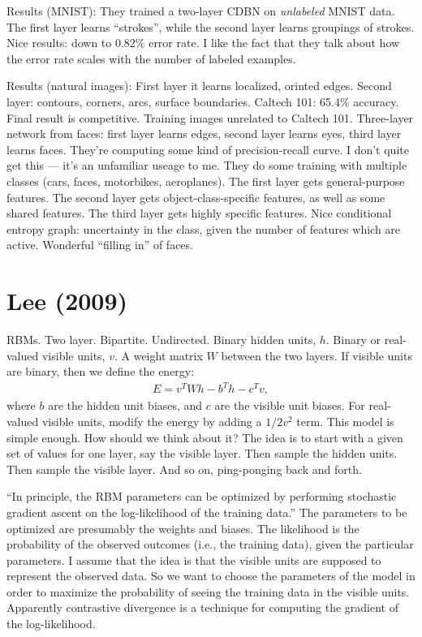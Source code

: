 \documentclass[12pt]{report}
\begin{document}
Results (MNIST): They trained a two-layer CDBN on \emph{unlabeled}
MNIST data.  The first layer learns ``strokes'', while the second
layer learns groupings of strokes.  Nice results: down to 0.82\% error
rate.  I like the fact that they talk about how the error rate scales
with the number of labeled examples.

Results (natural images): First layer it learns localized, orinted
edges.  Second layer: contours, corners, arcs, surface boundaries.
Caltech 101: 65.4\% accuracy.  Final result is competitive.  Training
images unrelated to Caltech 101.  Three-layer network from faces:
first layer learns edges, second layer learns eyes, third layer learns
faces.  They're computing some kind of precision-recall curve.  I
don't quite get this --- it's an unfamiliar useage to me.  They do
some training with multiple classes (cars, faces, motorbikes,
aeroplanes).  The first layer gets general-purpose features.  The
second layer gets object-class-specific features, as well as some
shared features.  The third layer gets highly specific features.  Nice
conditional entropy graph: uncertainty in the class, given the number
of features which are active.  Wonderful ``filling in'' of faces.

\section{Lee (2009)} 

RBMs.  Two layer.  Bipartite.  Undirected.  Binary hidden units, $h$.
Binary or real-valued visible units, $v$.  A weight matrix $W$ between
the two layers.  If visible units are binary, then we define the
energy:
\begin{eqnarray}
  E = v^T W h - b^T h-c^T v,
\end{eqnarray}
where $b$ are the hidden unit biases, and $c$ are the visible unit
biases.  For real-valued visible units, modify the energy by adding a
$1/2 v^2$ term.  This model is simple enough.  How should we think
about it?  The idea is to start with a given set of values for one
layer, say the visible layer.  Then sample the hidden units.  Then
sample the visible layer.  And so on, ping-ponging back and forth.

``In principle, the RBM parameters can be optimized by performing
stochastic gradient ascent on the log-likelihood of the training
data.''  The parameters to be optimized are presumably the weights and
biases.  The likelihood is the probability of the observed outcomes
(i.e., the training data), given the particular parameters.  I assume
that the idea is that the visible units are supposed to represent the
observed data.  So we want to choose the parameters of the model in
order to maximize the probability of seeing the training data in the
visible units.  Apparently contrastive divergence is a technique for
computing the gradient of the log-likelihood.
\end{document}
